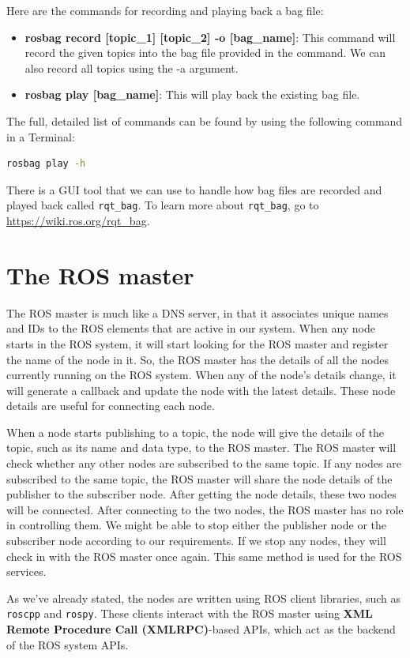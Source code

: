 \documentclass[../../main]{subfiles}
\begin{document}
Here are the commands for recording and playing back a bag file:
\begin{itemize}
    \item \textbf{rosbag record [topic\_1] [topic\_2] -o [bag\_name]}: This command will record the given topics into the bag file provided in the command. We can also record all topics using the -a argument.
    \item \textbf{rosbag play [bag\_name]}: This will play back the existing bag file.
\end{itemize}
The full, detailed list of commands can be found by using the following command in a
Terminal:
\begin{lstlisting}[language=bash, frame=shadowbox]
    rosbag play -h
\end{lstlisting}
There is a GUI tool that we can use to handle how bag files are recorded and played back called \texttt{rqt\_bag}. To learn more about \texttt{rqt\_bag}, go to \url{https://wiki.ros.org/rqt_bag}.
\newpage
\section{The ROS master}
The ROS master is much like a DNS server, in that it associates unique names and IDs to the ROS elements that are active in our system. When any node starts in the ROS system, it will start looking for the ROS master and register the name of the node in it. So, the ROS master has the details of all the nodes currently running on the ROS system. When any of the node's details change, it will generate a callback and update the node with the latest details. These node details are useful for connecting each node.

When a node starts publishing to a topic, the node will give the details of the topic, such as its name and data type, to the ROS master. The ROS master will check whether any other nodes are subscribed to the same topic. If any nodes are subscribed to the same topic, the ROS master will share the node details of the publisher to the subscriber node. After getting the node details, these two nodes will be connected. After connecting to the two nodes, the ROS master has no role in controlling them. We might be able to stop either the publisher node or the subscriber node according to our requirements. If we stop any nodes, they will check in with the ROS master once again. This same method is used for the ROS services.

As we've already stated, the nodes are written using ROS client libraries, such as \texttt{roscpp} and \texttt{rospy}. These clients interact with the ROS master using \textbf{XML Remote Procedure Call (XMLRPC)}-based APIs, which act as the backend of the ROS system APIs.
\end{document}
